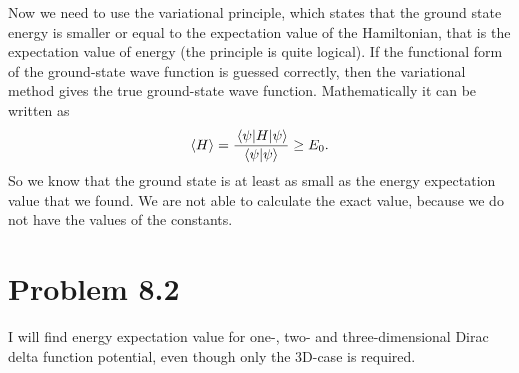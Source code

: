 \documentclass{scrartcl}
\begin{document}
Now we need to use the variational principle, which states that the ground state energy is smaller or equal to the expectation value of the Hamiltonian, that is the expectation value of energy (the principle is quite logical). If the functional form of the ground-state wave function is guessed correctly, then the variational method gives the true ground-state wave function. Mathematically it can be written as
\begin{equation}
\langle H\rangle=\frac{\mel{\psi}{H}{\psi}}{\braket{\psi}{\psi}}\ge E_0.
\end{equation}
So we know that the ground state is at least as small as the energy expectation value that we found. We are not able to calculate the exact value, because we do not have the values of the constants.
\section*{Problem 8.2}
I will find energy expectation value for one-, two- and three-dimensional Dirac delta function potential, even though only the 3D-case is required.
\end{document}
